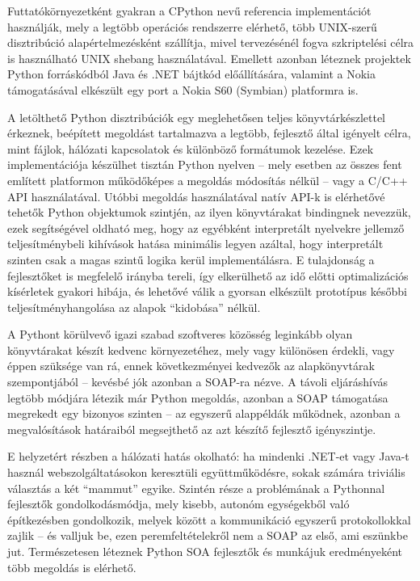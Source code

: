 Futtatókörnyezetként gyakran a CPython nevű referencia implementációt használják, mely a legtöbb operációs rendszerre elérhető, több UNIX-szerű disztribúció alapértelmezésként szállítja, mivel tervezésénél fogva szkriptelési célra is használható UNIX shebang használatával. Emellett azonban léteznek projektek Python forráskódból Java és .NET bájtkód előállítására, valamint a Nokia támogatásával elkészült egy port a Nokia S60 (Symbian) platformra is.

A letölthető Python disztribúciók egy meglehetősen teljes könyvtárkészlettel érkeznek, beépített megoldást tartalmazva a legtöbb, fejlesztő által igényelt célra, mint fájlok, hálózati kapcsolatok és különböző formátumok kezelése. Ezek implementációja készülhet tisztán Python nyelven -- mely esetben az összes fent említett platformon működőképes a megoldás módosítás nélkül -- vagy a C/C++ API használatával. Utóbbi megoldás használatával natív API-k is elérhetővé tehetők Python objektumok szintjén, az ilyen könyvtárakat bindingnek nevezzük, ezek segítségével oldható meg, hogy az egyébként interpretált nyelvekre jellemző teljesítménybeli kihívások hatása minimális legyen azáltal, hogy interpretált szinten csak a magas szintű logika kerül implementálásra. E tulajdonság a fejlesztőket is megfelelő irányba tereli, így elkerülhető az idő előtti optimalizációs kísérletek gyakori hibája, és lehetővé válik a gyorsan elkészült prototípus későbbi teljesítményhangolása az alapok ``kidobása'' nélkül.

\bigskip

A Pythont körülvevő igazi szabad szoftveres közösség leginkább olyan könyvtárakat készít kedvenc környezetéhez, mely vagy különösen érdekli, vagy éppen szüksége van rá, ennek következményei kedvezők az alapkönyvtárak szempontjából -- kevésbé jók azonban a SOAP-ra nézve. A távoli eljáráshívás legtöbb módjára létezik már Python megoldás, azonban a SOAP támogatása megrekedt egy bizonyos szinten -- az egyszerű alappéldák működnek, azonban a megvalósítások határaiból megsejthető az azt készítő fejlesztő igényszintje.

E helyzetért részben a hálózati hatás okolható: ha mindenki .NET-et vagy Java-t használ webszolgáltatásokon keresztüli együttműködésre, sokak számára triviális választás a két ``mammut'' egyike. Szintén része a problémának a Pythonnal fejlesztők gondolkodásmódja, mely kisebb, autonóm egységekből való építkezésben gondolkozik, melyek között a kommunikáció egyszerű protokollokkal zajlik -- és valljuk be, ezen peremfeltételekről nem a SOAP az első, ami eszünkbe jut. Természetesen léteznek Python SOA fejlesztők és munkájuk eredményeként több megoldás is elérhető.

